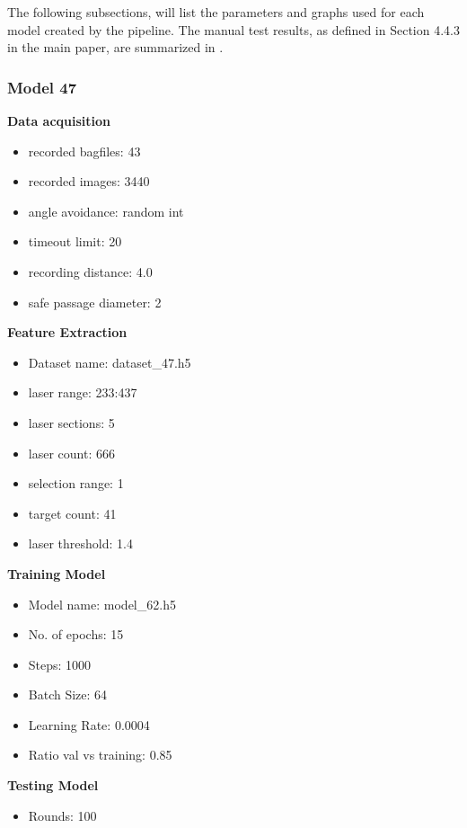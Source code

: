 The following subsections, will list the parameters and graphs used for each model created by the pipeline. The manual test results, as defined in Section 4.4.3 in the main paper, are summarized in .

\newpage
\subsubsection{Model 47\label{model_47} }
\begin{multicols}{2}\textbf{Data acquisition}
\begin{itemize}
\setlength\itemsep{0.1em}
\item recorded bagfiles: 43
\item recorded images: 3440
\item angle avoidance: random int
\item timeout limit: 20
\item recording distance: 4.0
\item safe passage diameter: 2
\end{itemize}
\textbf{Feature Extraction}
\begin{itemize}
\setlength\itemsep{0.1em}
\item Dataset name: dataset\_47.h5
\item  laser range: 233:437
\item  laser sections: 5
\item  laser count: 666
\item  selection range: 1
\item  target count: 41
\item  laser threshold: 1.4
\end{itemize}
\columnbreak
\textbf{Training Model}
\begin{itemize}
\setlength\itemsep{0.1em}
\item  Model name: model\_62.h5
\item  No. of epochs: 15
\item  Steps: 1000
\item  Batch Size: 64
\item  Learning Rate: 0.0004
\item  Ratio val vs training: 0.85
\end{itemize}
\textbf{Testing Model}
\begin{itemize}
\setlength\itemsep{0.1em}
\item Rounds: 100
\newline
\newline
\newline

\end{itemize}
\end{multicols}
